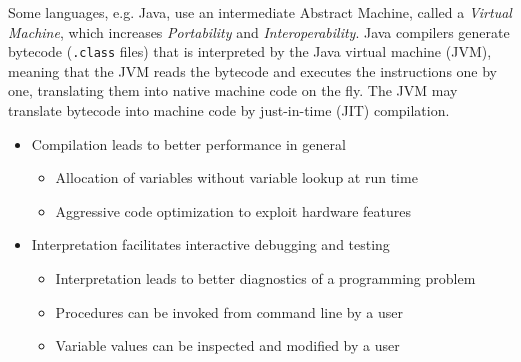 Some languages, e.g. Java, use an intermediate Abstract Machine, called a \textit{Virtual Machine},
which increases \textit{Portability} and \textit{Interoperability}.
Java compilers generate bytecode (\texttt{.class} files) that is interpreted by the Java virtual machine (JVM), meaning that the JVM reads the bytecode and executes the instructions one by one, translating them into native machine code on the fly. The JVM may translate bytecode into machine code by just-in-time (JIT) compilation.

\begin{itemize}
	\item Compilation leads to better performance in general
	    \begin{itemize}
		    \item Allocation of variables without variable lookup at run time
		    \item Aggressive code optimization to exploit hardware features
	    \end{itemize}
	\item Interpretation facilitates interactive debugging and testing
	    \begin{itemize}
		    \item Interpretation leads to better diagnostics of a programming problem
		    \item Procedures can be invoked from command line by a user
		    \item Variable values can be inspected and modified by a user
	    \end{itemize}
\end{itemize}
